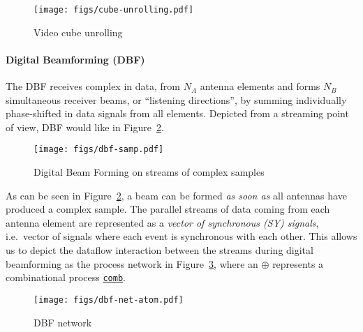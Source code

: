 \documentclass[
  a4paper,
]{article}
\let\oldparagraph\paragraph
\renewcommand{\paragraph}[1]{\oldparagraph{#1}\mbox{}}
\begin{document}
\begin{figure}
\hypertarget{fig:cube-unrolling}{%
\centering
\texttt{[image: figs/cube-unrolling.pdf]}
\caption{Video cube unrolling}\label{fig:cube-unrolling}
}
\end{figure}

\hypertarget{sec:dbf-atom}{%
\paragraph{Digital Beamforming (DBF)}\label{sec:dbf-atom}}

The DBF receives complex in data, from \(N_A\) antenna elements and
forms \(N_B\) simultaneous receiver beams, or ``listening directions'',
by summing individually phase-shifted in data signals from all elements.
Depicted from a streaming point of view, DBF would like in
Figure~\ref{fig:dbf-samp}.

\suppressfloats

\begin{figure}
\hypertarget{fig:dbf-samp}{%
\centering
\texttt{[image: figs/dbf-samp.pdf]}
\caption{Digital Beam Forming on streams of complex
samples}\label{fig:dbf-samp}
}
\end{figure}

As can be seen in Figure~\ref{fig:dbf-samp}, a beam can be formed
\emph{as soon as} all antennas have produced a complex sample. The
parallel streams of data coming from each antenna element are
represented as a \emph{vector of synchronous (SY) signals}, i.e.~vector
of signals where each event is synchronous with each other. This allows
us to depict the dataflow interaction between the streams during digital
beamforming as the process network in Figure~\ref{fig:dbf-net-atom},
where an \(\oplus\) represents a combinational process
\href{https://forsyde.github.io/forsyde-atom/api/ForSyDe-Atom-MoC.html\#v:comb22}{\texttt{comb}}.

\suppressfloats

\begin{figure}
\hypertarget{fig:dbf-net-atom}{%
\centering
\texttt{[image: figs/dbf-net-atom.pdf]}
\caption{DBF network}\label{fig:dbf-net-atom}
}
\end{figure}
\end{document}
